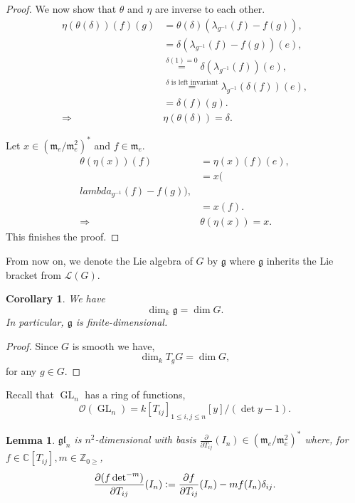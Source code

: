 \documentclass[10pt]{article}
\newtheorem{lemma}{Lemma}[section]
\newtheorem{corollary}{Corollary} [section]
\numberwithin{equation}{theorem}
\DeclareMathOperator{\GL}{GL}
\newcommand{\defeq}{\vcentcolon=}
\newcommand{\m}[0]{\mathfrak{m}}
\newcommand{\Ouv}[0]{\mathcal{O}}
\newcommand{\Z}[0]{\mathbb{Z}}
\newcommand{\C}[0]{\mathbb{C}}
\newcommand{\Lie}[0]{\mathcal{L}}
\newcommand{\g}[0]{\mathfrak{g}}
\newcommand{\gl}[0]{\mathfrak{gl}}
\begin{document}
\begin{proof}
We now show that $\theta$ and $\eta$ are inverse to each other. 
\begin{align*}
  \eta(\theta(\delta))(f)(g) & = \theta(\delta)(\lambda_{g^{-1}}(f)-f(g)),\\
  & = \delta(\lambda_{g^{-1}}(f)-f(g))(e),\\
  & \stackrel{\delta(1)=0}{=}\delta(\lambda_{g^{-1}}(f))(e),\\
  & \stackrel{\text{$\delta$ is left invariant}}{=}\lambda_{g^{-1}}(\delta(f))(e),\\
  & = \delta(f)(g).\\
  \Rightarrow & \eta(\theta(\delta))= \delta.
\end{align*}

Let $x\in(\m_e/\m_e^2)^*$ and $f\in \m_e$.
\begin{align*}
  \theta(\eta(x))(f) & = \eta(x)(f)(e),\\
  & = x(\\lambda_{g^{-1}}(f)-f(g)),\\
  & = x(f).\\
  \Rightarrow & \theta(\eta(x))=x.
\end{align*}
This finishes the proof.
\end{proof}
From now on, we denote the Lie algebra of $G$ by $\g$ where $\g$ inherits the Lie bracket from $\Lie(G)$.
\begin{corollary}
  \label{corollary_5_13}
  We have 
  \begin{equation*}
    \dim_k\g = \dim G.
  \end{equation*}
  In particular, $\g$ is finite-dimensional.
\end{corollary}
\begin{proof}
  Since $G$ is smooth we have,
  \begin{equation*}
    \dim_kT_gG = \dim G,
  \end{equation*}
  for any $g\in G$.
\end{proof}
Recall that $\GL_n$ has a ring of functions, 
\begin{equation*}
  \Ouv(\GL_n) = k[T_{ij}]_{1\leq i,j\leq n}[y]/(\det y-1).
\end{equation*}
\begin{lemma}
  \label{lemma_5_14}
  $\gl_n$ is $n^2$-dimensional with basis ${\frac {\partial} {\partial T_{ij}}}(I_n)\in(\m_e/\m_e^2)^*$ where, for $f\in \C[T_{ij}],m\in\Z_{0\geq}$,
  \begin{equation*}
  {\frac {\partial(f\det^{-m})} {\partial T_{ij}}}(I_n) \defeq {\frac {\partial f} {\partial T_{ij}}}(I_n) -mf(I_n)\delta_{ij}.
  \end{equation*}
\end{lemma}
\end{document}
